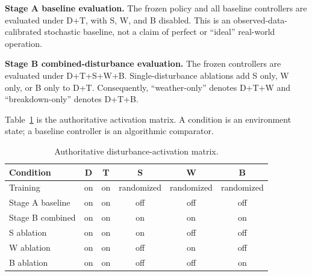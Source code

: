 \textbf{Stage A baseline evaluation.} The frozen policy and all baseline controllers are evaluated under D+T, with S, W, and B disabled. This is an observed-data-calibrated stochastic baseline, not a claim of perfect or ``ideal'' real-world operation.

\textbf{Stage B combined-disturbance evaluation.} The frozen controllers are evaluated under D+T+S+W+B. Single-disturbance ablations add S only, W only, or B only to D+T. Consequently, ``weather-only'' denotes D+T+W and ``breakdown-only'' denotes D+T+B.

Table~\ref{tab:activation-matrix} is the authoritative activation matrix. A condition is an environment state; a baseline controller is an algorithmic comparator.

\begin{table}[htbp]
\centering
\caption{Authoritative disturbance-activation matrix.}
\label{tab:activation-matrix}
\small
\begin{tabularx}{\textwidth}{Xccccc}
\toprule
\textbf{Condition} & \textbf{D} & \textbf{T} & \textbf{S} & \textbf{W} & \textbf{B} \\
\midrule
Training & on & on & randomized & randomized & randomized \\
Stage A baseline & on & on & off & off & off \\
Stage B combined & on & on & on & on & on \\
S ablation & on & on & on & off & off \\
W ablation & on & on & off & on & off \\
B ablation & on & on & off & off & on \\
\bottomrule
\end{tabularx}
\end{table}

